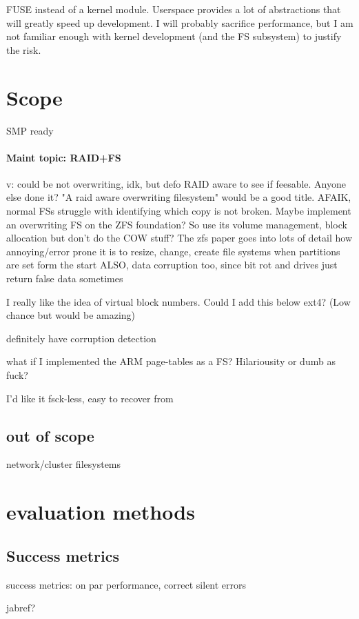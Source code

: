 \documentclass[a4paper]{report}
\begin{document}
        FUSE instead of a kernel module. Userspace provides a lot of
        abstractions that will greatly speed up development. I will probably
        sacrifice performance, but I am not familiar enough with kernel
        development (and the FS subsystem) to justify the risk.

    \section{Scope}
        SMP ready

        \paragraph{Maint topic: RAID+FS}
        v: could be not overwriting, idk, but defo RAID aware to see if feesable. Anyone else done it?
        "A raid aware overwriting filesystem" would be a good title. AFAIK,
        normal FSs struggle with identifying which copy is not broken. Maybe
        implement an overwriting FS on the ZFS foundation? So use its volume
        management, block allocation but don't do the COW stuff? The zfs paper
        goes into lots of detail how annoying/error prone it is to resize,
        change, create file systems when partitions are set form the start
        ALSO, data corruption too, since bit rot and drives just return false data sometimes

        I really like the idea of virtual block numbers. Could I add this below
        ext4? (Low chance but would be amazing)

        definitely have corruption detection

        what if I implemented the ARM page-tables as a FS? Hilariousity or dumb as fuck?

        I'd like it fsck-less, easy to recover from

        \subsection{out of scope}

            network/cluster filesystems


    \section{evaluation methods}

        \subsection{Success metrics}
            success metrics: on par performance, correct silent errors

    jabref?
\end{document}

